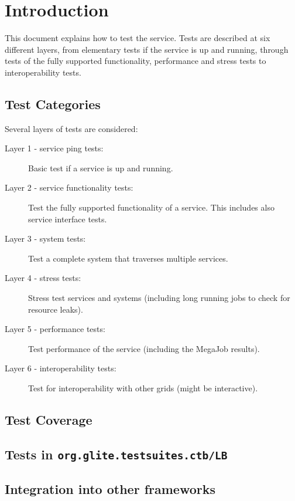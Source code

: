 \section{Introduction}

This document explains how to test the \LB service. Tests are described at six
different layers, from elementary tests if the service is up and running,
through tests of the fully supported functionality, performance and stress
tests to interoperability tests.



\subsection{Test Categories}
Several layers of tests are considered:

\begin{description}
\item[Layer 1 - service ping tests:] Basic test if a service is up and running.
\item[Layer 2 - service functionality tests:] Test the fully supported functionality of a service. This includes also service interface tests.
\item[Layer 3 - system tests:] Test a complete system that traverses multiple services.
\item[Layer 4 - stress tests:] Stress test services and systems (including long running jobs to check for resource leaks).
\item[Layer 5 - performance tests:] Test performance of the service (including the MegaJob results).
\item[Layer 6 - interoperability tests:] Test for interoperability with other grids (might be interactive).
\end{description}


\subsection{Test Coverage}


\subsection{Tests in \texttt{org.glite.testsuites.ctb/LB}}


\subsection{Integration into other frameworks}
